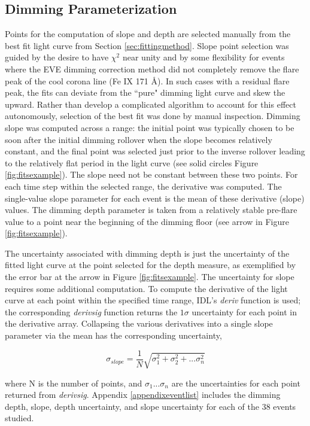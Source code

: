 \subsection{Dimming Parameterization}
Points for the computation of slope and depth are selected manually from the best fit light curve from Section \ref{sec:fittingmethod}. Slope point selection was guided by the desire to have $\chi^2$ near unity and by some flexibility for events where the EVE dimming correction method did not completely remove the flare peak of the cool corona line (Fe IX 171 \AA). In such cases with a residual flare peak, the fits can deviate from the ``pure" dimming light curve and skew the   upward. Rather than develop a complicated algorithm to account for this effect autonomously, selection of the best fit was done by manual inspection. Dimming slope was computed across a range: the initial point was typically chosen to be soon after the initial dimming rollover when the slope becomes relatively constant, and the final point was selected just prior to the inverse rollover leading to the relatively flat period in the light curve (see solid circles Figure \ref{fig:fitsexample}). The slope need not be constant between these two points. For each time step within the selected range, the derivative was computed. The single-value slope parameter for each event is the mean of these derivative (slope) values. The dimming depth parameter is taken from a relatively stable pre-flare value to a point near the beginning of the dimming floor (see arrow in Figure \ref{fig:fitsexample}). 

The uncertainty associated with dimming depth is just the uncertainty of the fitted light curve at the point selected for the depth measure, as exemplified by the error bar at the arrow in Figure \ref{fig:fitsexample}. The uncertainty for slope requires some additional computation. To compute the derivative of the light curve at each point within the specified time range, IDL's \textit{deriv} function is used; the corresponding \textit{derivsig} function returns the $1\sigma$ uncertainty for each point in the derivative array. Collapsing the various derivatives into a single slope parameter via the mean has the corresponding uncertainty, 

\begin{equation*}
    \sigma _{slope} = \frac{1}{N}\sqrt{\sigma^2_1 + \sigma^2_2 + ... \sigma^2_n}
\end{equation*}

\noindent where N is the number of points, and $\sigma_1$...$\sigma_n$ are the uncertainties for each point returned from \textit{derivsig}. Appendix \ref{appendixeventlist} includes the dimming depth, slope, depth uncertainty, and slope uncertainty for each of the 38 events studied. 

